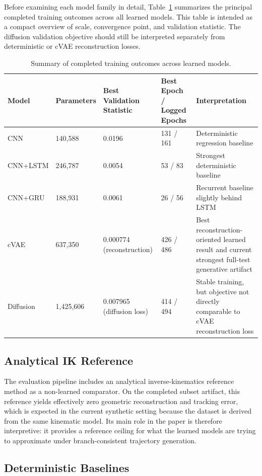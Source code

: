 \documentclass[11pt]{article}
\begin{document}
Before examining each model family in detail, Table~\ref{tab:training_outcomes} summarizes the principal completed training outcomes across all learned models. This table is intended as a compact overview of scale, convergence point, and validation statistic. The diffusion validation objective should still be interpreted separately from deterministic or cVAE reconstruction losses.

\begin{table}[h]
\centering
\caption{Summary of completed training outcomes across learned models.}
\label{tab:training_outcomes}
\begin{tabular}{p{2.1cm}p{2.0cm}p{2.9cm}p{2.4cm}p{4.3cm}}
\toprule
Model & Parameters & Best Validation Statistic & Best Epoch / Logged Epochs & Interpretation \\
\midrule
CNN & 140,588 & 0.0196 & 131 / 161 & Deterministic regression baseline \\
CNN+LSTM & 246,787 & 0.0054 & 53 / 83 & Strongest deterministic baseline \\
CNN+GRU & 188,931 & 0.0061 & 26 / 56 & Recurrent baseline slightly behind LSTM \\
cVAE & 637,350 & 0.000774 (reconstruction) & 426 / 486 & Best reconstruction-oriented learned result and current strongest full-test generative artifact \\
Diffusion & 1,425,606 & 0.007965 (diffusion loss) & 414 / 494 & Stable training, but objective not directly comparable to cVAE reconstruction loss \\
\bottomrule
\end{tabular}
\end{table}

\subsection{Analytical IK Reference}

The evaluation pipeline includes an analytical inverse-kinematics reference method as a non-learned comparator. On the completed subset artifact, this reference yields effectively zero geometric reconstruction and tracking error, which is expected in the current synthetic setting because the dataset is derived from the same kinematic model. Its main role in the paper is therefore interpretive: it provides a reference ceiling for what the learned models are trying to approximate under branch-consistent trajectory generation.

\subsection{Deterministic Baselines}
\end{document}
